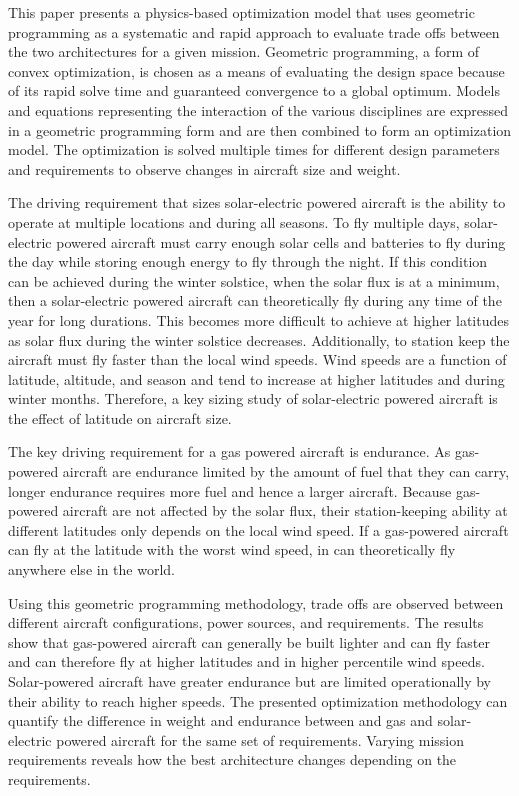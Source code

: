 This paper presents a physics-based optimization model that uses geometric programming as a systematic and rapid approach to evaluate trade offs between the two architectures for a given mission.  Geometric programming, a form of convex optimization, is chosen as a means of evaluating the design space because of its rapid solve time and guaranteed convergence to a global optimum.\cite{gp}
Models and equations representing the interaction of the various disciplines are expressed in a geometric programming form and are then combined to form an optimization model. 
The optimization is solved multiple times for different design parameters and requirements to observe changes in aircraft size and weight. 

The driving requirement that sizes solar-electric powered aircraft is the ability to operate at multiple locations and during all seasons.  
To fly multiple days, solar-electric powered aircraft must carry enough solar cells and batteries to fly during the day while storing enough energy to fly through the night.\cite{solartech}
If this condition can be achieved during the winter solstice, when the solar flux is at a minimum, then a solar-electric powered aircraft can theoretically fly during any time of the year for long durations. \cite{solartech}
This becomes more difficult to achieve at higher latitudes as solar flux during the winter solstice decreases.  
Additionally, to station keep the aircraft must fly faster than the local wind speeds.  
Wind speeds are a function of latitude, altitude, and season and tend to increase at higher latitudes and during winter months. 
Therefore, a key sizing study of solar-electric powered aircraft is the effect of latitude on aircraft size.  

The key driving requirement for a gas powered aircraft is endurance.  
As gas-powered aircraft are endurance limited by the amount of fuel that they can carry, longer endurance requires more fuel and hence a larger aircraft.  
Because gas-powered aircraft are not affected by the solar flux, their station-keeping ability at different latitudes only depends on the local wind speed. 
If a gas-powered aircraft can fly at the latitude with the worst wind speed, in can theoretically fly anywhere else in the world.  

Using this geometric programming methodology, trade offs are observed between different aircraft configurations, power sources, and requirements.  
The results show that gas-powered aircraft can generally be built lighter and can fly faster and can therefore fly at higher latitudes and in higher percentile wind speeds.  
Solar-powered aircraft have greater endurance but are limited operationally by their ability to reach higher speeds.  
The presented optimization methodology can quantify the difference in weight and endurance between and gas and solar-electric powered aircraft for the same set of requirements. 
Varying mission requirements reveals how the best architecture changes depending on the requirements. 

